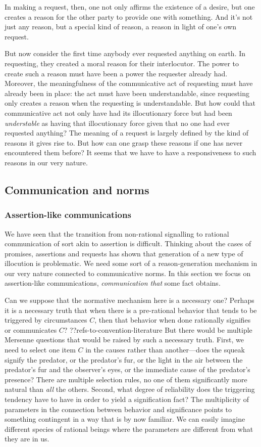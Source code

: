 In making a request, then, one not only affirms the existence of a desire, but one creates a reason for the other 
party to provide one with something. And it's not just any reason, but a special kind of reason, a reason in light of one's own request.

But now consider the first time anybody ever requested anything on earth. In requesting, they created a moral reason for their interlocutor. 
The power to create such a reason must have been a power the requester already had.  Moreover, the meaningfulness of 
the communicative act of requesting must have already been in place: the act must have been understandable, 
since requesting only creates a reason when the requesting is understandable. But how could that communicative act not only have had its illocutionary force but had been \textit{understable} as having that illocutionary 
force given that no one had ever requested anything? The meaning of a request is largely defined by the kind of reasons it gives
rise to. But how can one grasp these reasons if one has never encountered them before? It seems that we have to have
a responsiveness to such reasons in our very nature.

\subsection{Communication and norms}
\subsubsection{Assertion-like communications}
We have seen that the transition from non-rational signalling to rational communication of sort akin to assertion
is difficult. Thinking
about the cases of promises, assertions and requests has shown that generation of a new type of illocution is 
problematic. We need some sort of a reason-generation mechanism in our very nature connected to communicative
norms. In this section we focus on assertion-like communications, \textit{communication that} some fact obtains.

Can we suppose that the normative mechanism here is a necessary one? Perhaps it is a necessary truth that when
there is a pre-rational behavior that tends to be triggered by circumstances $C$, then that behavior when done rationally
signifies or communicates $C$? ??refs-to-convention-literature 
But there would be multiple Mersenne questions that would be raised by such a necessary truth. First,
we need to select one item $C$ in the causes rather than another---does the squeak signify the predator, or the predator's fur, or the
light in the air between the predator's fur and the observer's eyes, or the immediate cause of the predator's presence? 
There are multiple selection rules, 
no one of them significantly more natural than \textit{all} the others. Second, what degree of reliability does the 
triggering tendency have to have in order to yield a signification fact? 
The multiplicity of parameters in the connection between behavior and
significance points to something contingent in a way that is by now familiar. 
We can easily imagine different species of rational beings where the parameters are
different from what they are in us. 


